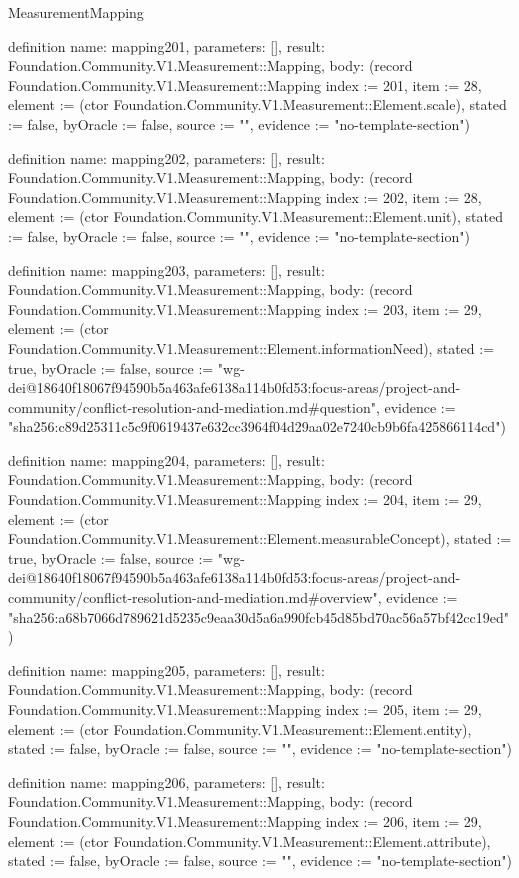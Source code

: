 \begin{lexlean}{MeasurementMapping}
\begin{semanticmodule}
definition{
  name: mapping201,
  parameters: [],
  result: Foundation.Community.V1.Measurement::Mapping,
  body: (record Foundation.Community.V1.Measurement::Mapping {index := 201, item := 28, element := (ctor Foundation.Community.V1.Measurement::Element.scale), stated := false, byOracle := false, source := "", evidence := "no-template-section"})
}

definition{
  name: mapping202,
  parameters: [],
  result: Foundation.Community.V1.Measurement::Mapping,
  body: (record Foundation.Community.V1.Measurement::Mapping {index := 202, item := 28, element := (ctor Foundation.Community.V1.Measurement::Element.unit), stated := false, byOracle := false, source := "", evidence := "no-template-section"})
}

definition{
  name: mapping203,
  parameters: [],
  result: Foundation.Community.V1.Measurement::Mapping,
  body: (record Foundation.Community.V1.Measurement::Mapping {index := 203, item := 29, element := (ctor Foundation.Community.V1.Measurement::Element.informationNeed), stated := true, byOracle := false, source := "wg-dei@18640f18067f94590b5a463afe6138a114b0fd53:focus-areas/project-and-community/conflict-resolution-and-mediation.md#question", evidence := "sha256:c89d25311c5c9f0619437e632cc3964f04d29aa02e7240cb9b6fa425866114cd"})
}

definition{
  name: mapping204,
  parameters: [],
  result: Foundation.Community.V1.Measurement::Mapping,
  body: (record Foundation.Community.V1.Measurement::Mapping {index := 204, item := 29, element := (ctor Foundation.Community.V1.Measurement::Element.measurableConcept), stated := true, byOracle := false, source := "wg-dei@18640f18067f94590b5a463afe6138a114b0fd53:focus-areas/project-and-community/conflict-resolution-and-mediation.md#overview", evidence := "sha256:a68b7066d789621d5235c9eaa30d5a6a990fcb45d85bd70ac56a57bf42cc19ed"})
}

definition{
  name: mapping205,
  parameters: [],
  result: Foundation.Community.V1.Measurement::Mapping,
  body: (record Foundation.Community.V1.Measurement::Mapping {index := 205, item := 29, element := (ctor Foundation.Community.V1.Measurement::Element.entity), stated := false, byOracle := false, source := "", evidence := "no-template-section"})
}

definition{
  name: mapping206,
  parameters: [],
  result: Foundation.Community.V1.Measurement::Mapping,
  body: (record Foundation.Community.V1.Measurement::Mapping {index := 206, item := 29, element := (ctor Foundation.Community.V1.Measurement::Element.attribute), stated := false, byOracle := false, source := "", evidence := "no-template-section"})
}


\end{semanticmodule}
\end{lexlean}
